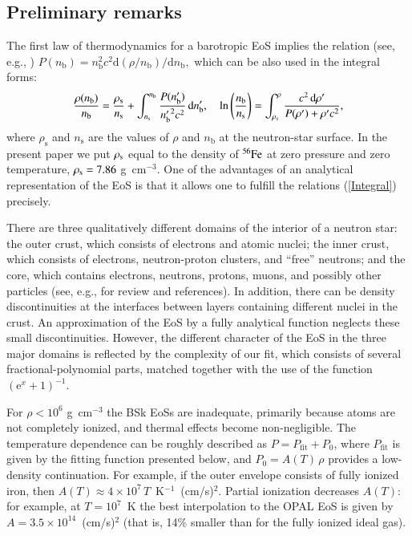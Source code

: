 \documentclass{aa}
\newcommand{\gcc}{\mbox{g cm$^{-3}$}}
\newcommand{\dd}{\mathrm{d}}
\newcommand{\nb}{n_\mathrm{b}}
\begin{document}
\subsection{Preliminary remarks}
\label{sect:prelim}

The first law of thermodynamics for a barotropic EoS implies the
relation (see, e.g., \citealt{HaenselProsz82})
$
P(\nb)=\nb^2 c^2 \dd(\rho/\nb)/\dd\nb,
$
which can be also used in the integral
forms:
\begin{equation}
\frac{\rho(\nb)}{\nb} = \frac{\rho_\mathrm{s}}{n_\mathrm{s}} +
\int_{n_\mathrm{s}}^{\nb} {P(\nb')\over {\nb'}^2 c^2}\,
\dd \nb',
\quad
\ln\left(\frac{\nb}{n_\mathrm{s}}\right) = 
 \int_{\rho_\mathrm{s}}^\rho
 \frac{c^2\,\dd\rho'}{P(\rho') + \rho' c^2} ,
\label{Integral}
\end{equation}
where $\rho_\mathrm{s}$ and $n_\mathrm{s}$ are the values of
$\rho$ and $\nb$ at the neutron-star surface. In the present
paper we put $\rho_{\rm s}$ equal to the density of $^{56}{\rm
Fe}$ at zero pressure and zero temperature, $\rho_{\rm
s}=7.86$ \gcc. One of the advantages of an analytical
representation of the EoS is that it allows one to fulfill
the relations (\ref{Integral}) precisely.

There are three qualitatively different domains of the interior of a neutron 
star: the outer crust, which consists of electrons and
atomic nuclei; the inner crust, which consists of electrons, neutron-proton 
clusters, and ``free'' neutrons; and the core, which
contains electrons, neutrons, protons, muons, and possibly other particles 
(see, e.g., \citealt{HPY} for review and references). In addition,
there can be density discontinuities at the interfaces
between layers containing different nuclei in the crust. An
approximation of the EoS by a fully analytical function
neglects these small discontinuities. However, the different
character of the EoS in the three major domains is
reflected by the complexity of our fit, which consists of
several fractional-polynomial parts, matched together with
the use of the function
$
    (\mathrm{e}^x+1)^{-1}.
$


For $\rho<10^6$ \gcc{} the BSk EoSs are inadequate, primarily because atoms are 
not completely ionized, and thermal effects become non-negligible. 
The temperature dependence can be
roughly described as
\citep{HP04} $P=P_\mathrm{fit}+P_0$, where $P_\mathrm{fit}$
is given by the fitting function presented below, and
$P_0=A(T)\,\rho$ provides a low-density continuation. For
example, if the outer envelope consists of fully ionized
iron,  then
$A(T)\approx4\times10^7\,T$~K$^{-1}$~(cm/s)$^2$.
Partial ionization decreases $A(T)$: for example, at
$T=10^7$~K the best interpolation to the OPAL EoS
\citep{OPAL-EoS} is given by
$A=3.5\times10^{14}$~(cm/s)$^2$ (that is, 14\% smaller
than for the fully ionized ideal gas).
\end{document}

